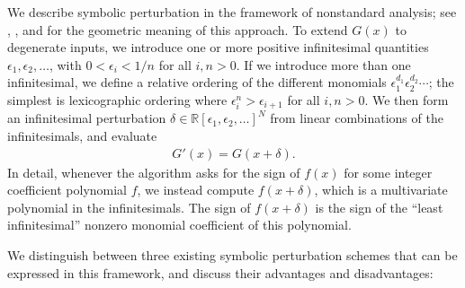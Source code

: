 \documentclass[11pt]{article}
\newcommand{\R}{\mathbb{R}}
\begin{document}
We describe symbolic perturbation in the framework of nonstandard analysis; see \cite{yap1990symbolic}, \cite{emiris1995general},
and \cite{seidel1998nature} for the geometric meaning of this approach.  To extend $G(x)$ to degenerate inputs, we introduce one
or more positive infinitesimal quantities $\epsilon_1, \epsilon_2, \ldots$, with $0 < \epsilon_i < 1/n$ for all $i,n > 0$.  If
we introduce more than one infinitesimal, we define a relative ordering of the different monomials $\epsilon_1^{d_1} \epsilon_2^{d_2} \cdots$;
the simplest is lexicographic ordering where $\epsilon_i^n > \epsilon_{i+1}$ for all $i,n > 0$.
We then form an infinitesimal perturbation $\delta \in \R[\epsilon_1,\epsilon_2, \ldots]^N$ from
linear combinations of the infinitesimals, and evaluate
\begin{align*}
G'(x) = G(x+\delta).
\end{align*}
In detail, whenever the algorithm asks for the sign of $f(x)$ for some integer coefficient polynomial $f$, we instead compute
$f(x+\delta)$, which is a multivariate polynomial in the infinitesimals.  The sign of $f(x+\delta)$ is the sign of the ``least infinitesimal''
nonzero monomial coefficient of this polynomial.

We distinguish between three existing symbolic perturbation schemes that can be expressed in this framework, and discuss their advantages
and disadvantages:
\end{document}

